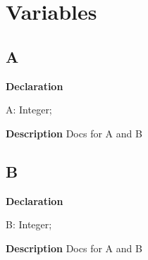 \documentclass{report}
\newif\ifpdf
\begin{document}
\section{Variables}
\ifpdf
\subsection*{\large{\textbf{A}}\normalsize\hspace{1ex}\hrulefill}
\else
\subsection*{A}
\fi
\label{ok_multiple_vars-A}
\begin{list}{}{
\setlength{\itemindent}{0cm}
\setlength{\listparindent}{0cm}
\setlength{\leftmargin}{\evensidemargin}
\addtolength{\leftmargin}{\tmplength}
\settowidth{\labelsep}{X}
\addtolength{\leftmargin}{\labelsep}
\setlength{\labelwidth}{\tmplength}
}
\item[\textbf{Declaration}\hfill]
\ifpdf
\begin{flushleft}
\fi
\begin{ttfamily}
A: Integer;\end{ttfamily}

\ifpdf
\end{flushleft}
\fi

\par
\item[\textbf{Description}]
Docs for A and B

\end{list}
\ifpdf
\subsection*{\large{\textbf{B}}\normalsize\hspace{1ex}\hrulefill}
\else
\subsection*{B}
\fi
\label{ok_multiple_vars-B}
\begin{list}{}{
\setlength{\itemindent}{0cm}
\setlength{\listparindent}{0cm}
\setlength{\leftmargin}{\evensidemargin}
\addtolength{\leftmargin}{\tmplength}
\settowidth{\labelsep}{X}
\addtolength{\leftmargin}{\labelsep}
\setlength{\labelwidth}{\tmplength}
}
\item[\textbf{Declaration}\hfill]
\ifpdf
\begin{flushleft}
\fi
\begin{ttfamily}
B: Integer;\end{ttfamily}

\ifpdf
\end{flushleft}
\fi

\par
\item[\textbf{Description}]
Docs for A and B

\end{list}
\ifpdf
\end{document}
